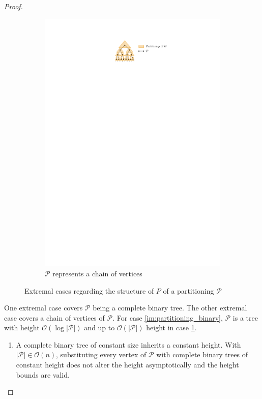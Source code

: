 \begin{proof}
\begin{figure}[H]
\begin{subfigure}{0.6\textwidth}
			\includegraphics[page=2,width=\linewidth]{graphics/Partitioning_scheme.pdf}
			\caption{$\mathcal{P}$ represents a chain of vertices}\label{im:partitioning_chain}
		\end{subfigure}
		\caption{Extremal cases regarding the structure of $P$ of a partitioning $\mathcal{P}$}\label{im:partitioning_scheme}
	\end{figure}
	One extremal case covers $\mathcal{P}$ being a complete binary tree. The other extremal case covers a chain of vertices of $\mathcal{P}$. For case \ref{im:partitioning_binary}, $\mathcal{P}$ is a tree with height $\mathcal{O}(\log |\mathcal{P}|)$ and up to $\mathcal{O}(|\mathcal{P}|)$ height in case \ref{im:partitioning_chain}.
	\begin{enumerate}
		\item A complete binary tree of constant size inherits a constant height. With $|\mathcal{P}|\in \mathcal{O}(n)$, substituting every vertex of $\mathcal{P}$ with complete binary trees of constant height does not alter the height asymptotically and the height bounds are valid.

\end{enumerate}
\end{proof}
